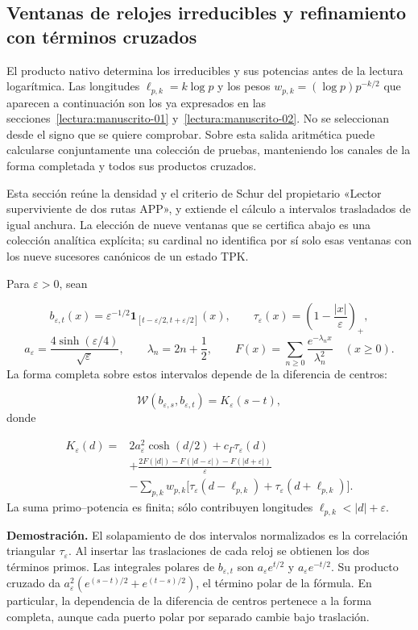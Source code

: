 \subsection{Ventanas de relojes irreducibles y refinamiento con términos cruzados}
\label{rz:ventanas}
El producto nativo determina los irreducibles y sus potencias antes de la lectura logarítmica. Las longitudes \(\ell_{p,k}=k\log p\) y los pesos \(w_{p,k}=(\log p)p^{-k/2}\) que aparecen a continuación son los ya expresados en las secciones~\ref{lectura:manuscrito-01} y~\ref{lectura:manuscrito-02}. No se seleccionan desde el signo que se quiere comprobar. Sobre esta salida aritmética puede calcularse conjuntamente una colección de pruebas, manteniendo los canales de la forma completada y todos sus productos cruzados.

Esta sección reúne la densidad y el criterio de Schur del propietario «Lector superviviente de dos rutas APP», y extiende el cálculo a intervalos trasladados de igual anchura. La elección de nueve ventanas que se certifica abajo es una colección analítica explícita; su cardinal no identifica por sí solo esas ventanas con los nueve sucesores canónicos de un estado TPK.

Para \(\varepsilon>0\), sean

\[
b_{\varepsilon,t}(x)=\varepsilon^{-1/2}
\mathbf1_{[t-\varepsilon/2,t+\varepsilon/2]}(x),\qquad
\tau_\varepsilon(x)=\left(1-\frac{|x|}{\varepsilon}\right)_+,
\]
\[
a_\varepsilon=\frac{4\sinh(\varepsilon/4)}{\sqrt\varepsilon},
\qquad \lambda_n=2n+\frac12,\qquad
F(x)=\sum_{n\geq0}\frac{e^{-\lambda_nx}}{\lambda_n^2}
\quad(x\geq0).
\]
La forma completa sobre estos intervalos depende de la diferencia de centros:

\[
\mathscr W(b_{\varepsilon,s},b_{\varepsilon,t})
=K_\varepsilon(s-t),
\]
donde

\[
\begin{aligned}
K_\varepsilon(d)={}&2a_\varepsilon^2\cosh(d/2)
+c_\Gamma\tau_\varepsilon(d)\\
&+\frac{2F(|d|)-F(|d-\varepsilon|)-F(|d+\varepsilon|)}{\varepsilon}\\
&-\sum_{p,k}w_{p,k}\bigl[
\tau_\varepsilon(d-\ell_{p,k})+
\tau_\varepsilon(d+\ell_{p,k})\bigr].
\end{aligned}
\]
La suma primo–potencia es finita; sólo contribuyen longitudes \(\ell_{p,k}<|d|+\varepsilon\).

\textbf{Demostración.} El solapamiento de dos intervalos normalizados es la correlación triangular \(\tau_\varepsilon\). Al insertar las traslaciones de cada reloj se obtienen los dos términos primos. Las integrales polares de \(b_{\varepsilon,t}\) son \(a_\varepsilon e^{t/2}\) y \(a_\varepsilon e^{-t/2}\). Su producto cruzado da \(a_\varepsilon^2(e^{(s-t)/2}+e^{(t-s)/2})\), el término polar de la fórmula. En particular, la dependencia de la diferencia de centros pertenece a la forma completa, aunque cada puerto polar por separado cambie bajo traslación.

